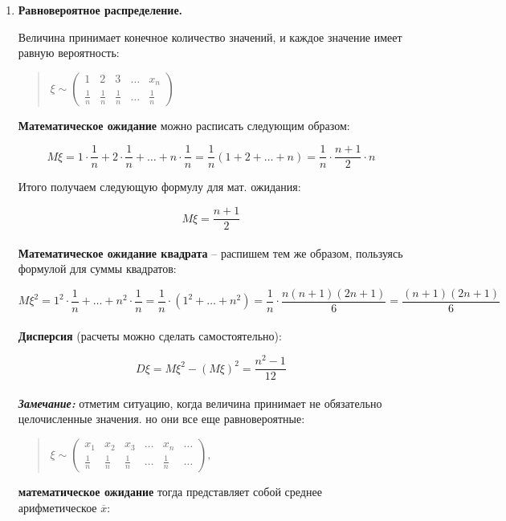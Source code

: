 \documentclass{article}
\begin{document}
\begin{enumerate}
\item \textbf{Равновероятное распределение.}

Величина принимает конечное количество значений, и каждое значение имеет равную вероятность:

\begin{quote}
$\xi \sim
\begin{pmatrix}
1 & 2 & 3 & \ldots & x_n\\
\frac{1}{n} & \frac{1}{n} & \frac{1}{n} & \ldots & \frac{1}{n}
\end{pmatrix}$
\end{quote}

\textbf{Математическое ожидание} можно расписать следующим образом:

$$M\xi = 1 \cdot \frac{1}{n} + 2 \cdot \frac{1}{n} + \ldots + n \cdot \frac{1}{n} =
\frac{1}{n} (1 + 2 + \ldots + n) = \frac{1}{n} \cdot \frac{n + 1}{2} \cdot n $$

Итого получаем следующую формулу для мат. ожидания:

$$M\xi = \frac{n + 1}{2}$$
\\

\textbf{Математическое ожидание квадрата} -- распишем тем же образом, пользуясь формулой для суммы квадратов:

$$M\xi^2 = 1^2 \cdot \frac{1}{n} + \ldots + n^2 \cdot \frac{1}{n} =
\frac{1}{n} \cdot (1^2 + \ldots + n^2) =
\frac{1}{n} \cdot \frac{n(n + 1)(2n + 1)}{6} = \frac{(n + 1)(2n + 1)}{6}$$
\\

\textbf{Дисперсия} (расчеты можно сделать самостоятельно):

$$D\xi = M\xi^2 - (M\xi)^2 = \frac{n^2 - 1}{12}$$ 
\\

\textbf{\textit{Замечание: }} отметим ситуацию, когда величина принимает не обязательно целочисленные значения. но они все еще равновероятные:

\begin{quote}
$\xi \sim
\begin{pmatrix}
x_1 & x_2 & x_3 & \ldots & x_n & \ldots\\
\frac{1}{n} & \frac{1}{n} & \frac{1}{n} & \ldots & \frac{1}{n} & \ldots
\end{pmatrix},$
\end{quote}

\textbf{математическое ожидание} тогда представляет собой среднее арифметическое $\overline{x}$:


\end{enumerate}
\end{document}
